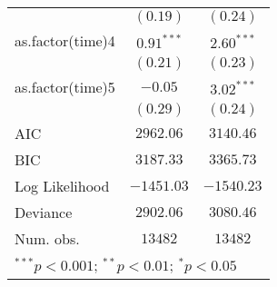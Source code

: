 \begin{tabular}{l c c}
                 & $(0.19)$      & $(0.24)$       \\
as.factor(time)4 & $0.91^{***}$  & $2.60^{***}$   \\
                 & $(0.21)$      & $(0.23)$       \\
as.factor(time)5 & $-0.05$       & $3.02^{***}$   \\
                 & $(0.29)$      & $(0.24)$       \\
\midrule
AIC              & $2962.06$     & $3140.46$      \\
BIC              & $3187.33$     & $3365.73$      \\
Log Likelihood   & $-1451.03$    & $-1540.23$     \\
Deviance         & $2902.06$     & $3080.46$      \\
Num. obs.        & $13482$       & $13482$        \\
\bottomrule
\multicolumn{3}{l}{\scriptsize{$^{***}p<0.001$; $^{**}p<0.01$; $^{*}p<0.05$}}
\end{tabular}
